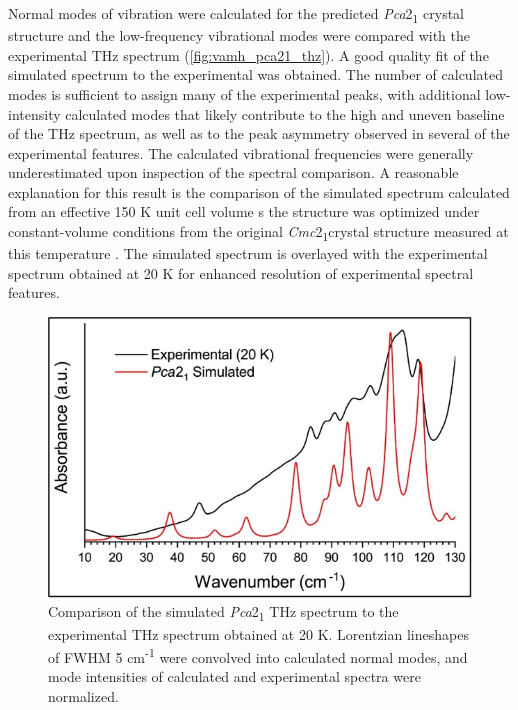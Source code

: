 Normal modes of vibration were calculated for the predicted \textit{Pca}2\textsubscript{1} crystal structure and the low-frequency vibrational modes were compared with the experimental THz spectrum (\autoref{fig:vamh_pca21_thz}). A good quality fit of the simulated spectrum to the experimental was obtained. The number of calculated modes is sufficient to assign many of the experimental peaks, with additional low-intensity calculated modes that likely contribute to the high and uneven baseline of the THz spectrum, as well as to the peak asymmetry observed in several of the experimental features. The calculated vibrational frequencies were generally underestimated upon inspection of the spectral comparison. A reasonable explanation for this result is the comparison of the simulated spectrum calculated from an effective 150 K unit cell volume s the structure was optimized under constant-volume conditions from the original \textit{Cmc}2\textsubscript{1}crystal structure measured at this temperature \citep{leguy_dynamic_2016}. The simulated spectrum is overlayed with the experimental spectrum obtained at 20 K for enhanced resolution of experimental spectral features.  
 
\begin{figure}[ht!]
  \center
  \includegraphics[width=1\linewidth]{src/figures/VAMH_figures/vamh_fig9.png}
  \caption{Comparison of the simulated \textit{Pca}2\textsubscript{1} THz spectrum to the experimental THz spectrum obtained at 20 K. Lorentzian lineshapes of FWHM 5 cm\textsuperscript{-1} were convolved into calculated normal modes, and mode intensities of calculated and experimental spectra were normalized. }
  \label{fig:vamh_pca21_thz}
\end{figure}

